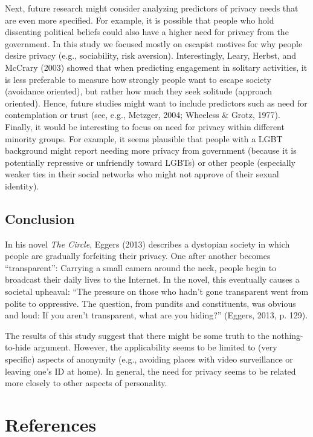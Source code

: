 \documentclass[man,floatsintext]{apa6}
\begin{document}
Next, future research might consider analyzing predictors of privacy needs that are even more specified. For example, it is possible that people who hold dissenting political beliefs could also have a higher need for privacy from the government. In this study we focused mostly on escapist motives for why people desire privacy (e.g., sociability, risk aversion). Interestingly, Leary, Herbst, and McCrary (2003) showed that when predicting engagement in solitary activities, it is less preferable to measure how strongly people want to escape society (avoidance oriented), but rather how much they seek solitude (approach oriented). Hence, future studies might want to include predictors such as need for contemplation or trust (see, e.g., Metzger, 2004; Wheeless \& Grotz, 1977). Finally, it would be interesting to focus on need for privacy within different minority groups. For example, it seems plausible that people with a LGBT background might report needing more privacy from government (because it is potentially repressive or unfriendly toward LGBTs) or other people (especially weaker ties in their social networks who might not approve of their sexual identity).

\hypertarget{conclusion}{%
\subsection{Conclusion}\label{conclusion}}

In his novel \emph{The Circle}, Eggers (2013) describes a dystopian society in which people are gradually forfeiting their privacy. One after another becomes \enquote{transparent}: Carrying a small camera around the neck, people begin to broadcast their daily lives to the Internet. In the novel, this eventually causes a societal upheaval: \enquote{The pressure on those who hadn't gone transparent went from polite to oppressive. The question, from pundits and constituents, was obvious and loud: If you aren't transparent, what are you hiding?} (Eggers, 2013, p. 129).

The results of this study suggest that there might be some truth to the nothing-to-hide argument. However, the applicability seems to be limited to (very specific) aspects of anonymity (e.g., avoiding places with video surveillance or leaving one's ID at home). In general, the need for privacy seems to be related more closely to other aspects of personality.

\newpage

\hypertarget{references}{%
\section{References}\label{references}}
\end{document}
